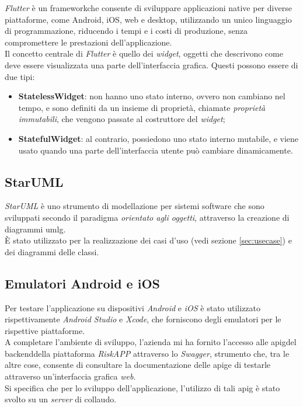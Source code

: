\emph{Flutter}\cite{site:flutter} è un \gls{framework}\glsoccur che consente di sviluppare applicazioni native per diverse piattaforme, come Android, iOS, web e desktop, utilizzando un unico linguaggio di programmazione, riducendo i tempi e i costi di produzione, senza compromettere le prestazioni dell'applicazione.\\
Il concetto centrale di \emph{Flutter} è quello dei \emph{widget}, oggetti che descrivono come deve essere visualizzata una parte dell'interfaccia grafica. Questi possono essere di due tipi:
\begin{itemize}
    \item \textbf{StatelessWidget}: non hanno uno stato interno, ovvero non cambiano nel tempo, e sono definiti da un insieme di proprietà, chiamate \emph{proprietà immutabili}, che vengono passate al costruttore del \emph{widget};
    \item \textbf{StatefulWidget}: al contrario, possiedono uno stato interno mutabile, e viene usato quando una parte dell'interfaccia utente può cambiare dinamicamente.
\end{itemize}

\subsection*{StarUML}
\label{subsec:staruml}

\emph{StarUML}\cite{site:staruml} è uno strumento di modellazione per sistemi software che sono sviluppati secondo il paradigma \emph{orientato agli oggetti}, attraverso la creazione di diagrammi \gls{umlg}\glsoccur.\\
È stato utilizzato per la realizzazione dei casi d'uso (vedi sezione \ref{sec:usecase}) e dei diagrammi delle classi.

\subsection*{Emulatori Android e iOS}
\label{subsec:emulatori}

Per testare l'applicazione su dispositivi \emph{Android} e \emph{iOS} è stato utilizzato rispettivamente \emph{Android Studio}\cite{site:android-studio} e \emph{Xcode}\cite{site:xcode}, che forniscono degli emulatori per le rispettive piattaforme.\\

A completare l'ambiente di sviluppo, l'azienda mi ha fornito l'accesso alle \gls{apig}\glsoccur del \gls{backend}\glsoccur della piattaforma \emph{RiskAPP} attraverso lo \emph{Swagger}\cite{site:swagger}, strumento che, tra le altre cose, consente di consultare la documentazione delle \gls{apig}\glsoccur e di testarle attraverso un'interfaccia grafica \emph{web}.\\
Si specifica che per lo sviluppo dell'applicazione, l'utilizzo di tali \gls{apig} è stato svolto su un \emph{server} di collaudo.